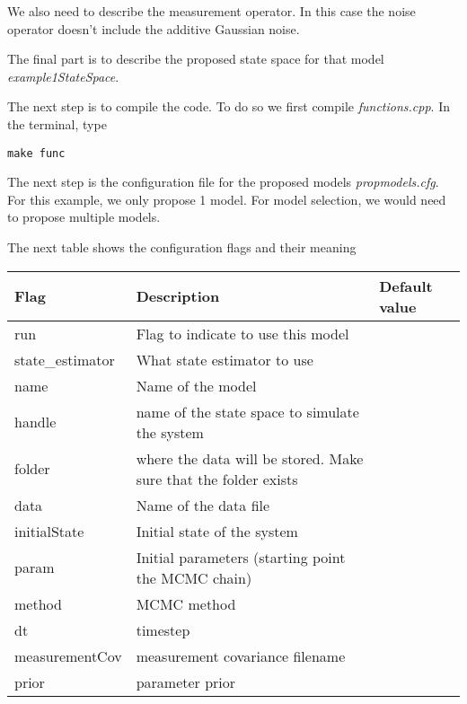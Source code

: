 \documentclass{article}
\begin{document}
% 

We also need to describe the measurement operator. In this case the noise operator doesn't include the additive Gaussian noise.
% 

The final part is to describe the proposed state space for that model {\em example1StateSpace}.
% 

The next step is to compile the code. To do so we first compile {\em functions.cpp}. In the terminal, type
\begin{lstlisting}
make func
\end{lstlisting}

The next step is the configuration file for the proposed models {\em propmodels.cfg}. For this example, we only propose 1 model. For model selection, we would need to propose multiple models.

% 

The next table shows the configuration flags and their meaning
\begin{table}[h]
\begin{tabular}{| l | l | l |}
\hline 
Flag & Description & Default value \\
\hline 
run & Flag to indicate to use this model & \\
state\_estimator & What state estimator to use & \\
name & Name of the model & \\
handle & name of the state space to simulate the system & \\
folder & where the data will be stored. Make sure that the folder exists & \\
data & Name of the data file &  \\
initialState & Initial state of the system & \\
param & Initial parameters (starting point the MCMC chain) & \\
method & MCMC method & \\
dt & timestep & \\
measurementCov & measurement covariance filename & \\
prior & parameter prior & \\
\hline
\end{tabular}
\end{table}
\end{document}
